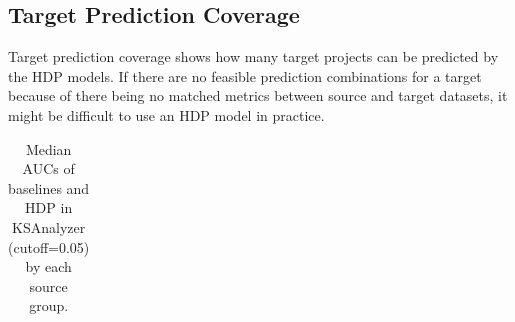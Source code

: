 
\subsection{Target Prediction Coverage}
\label{subsec02}
Target prediction coverage shows how many target projects can be
predicted by the HDP models. If there are no feasible prediction
combinations for a target because of there being no matched metrics
between source and target datasets, it might be difficult to use an HDP model in
practice.

\begin{table}[t]
\centering
\caption{Median AUCs of baselines and
HDP in KSAnalyzer (cutoff=0.05) by each source group.
}
\label{tab:compare}
\begin{tabular}{|@{ }c@{ }|@{ }c@{ }|@{ }c@{ }|@{ }c@{ }|@{ }c@{ }|@{ }c@{ }||@{ }c@{ }|}
\hline


\end{tabular}
\end{table}
